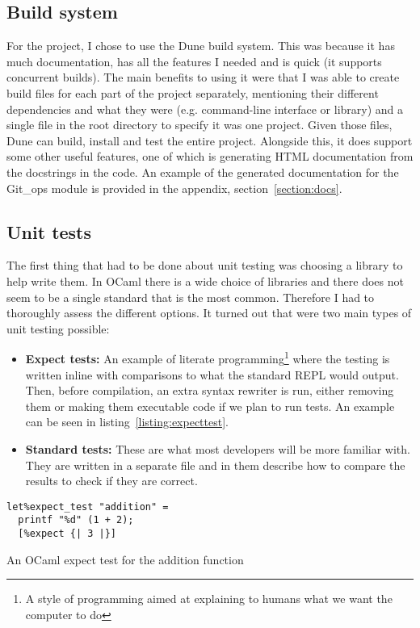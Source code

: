 \subsection{Build system}

For the project, I chose to use the Dune\cite{code_dune} build system. This was because it has much documentation, has all the features I needed and is quick (it supports concurrent builds). The main benefits to using it were that I was able to create build files for each part of the project separately, mentioning their different dependencies and what they were (e.g. command-line interface or library) and a single file in the root directory to specify it was one project. Given those files, Dune can build, install and test the entire project. Alongside this, it does support some other useful features, one of which is generating HTML documentation from the docstrings in the code. An example of the generated documentation for the Git\_ops module is provided in the appendix, section\unskip~\ref{section:docs}.

\subsection{Unit tests}

The first thing that had to be done about unit testing was choosing a library to help write them. In OCaml there is a wide choice of libraries and there does not seem to be a single standard that is the most common. Therefore I had to thoroughly assess the different options. It turned out that were two main types of unit testing possible:
\begin{itemize}
  \item \textbf{Expect tests:} An example of literate programming\footnote{A style of programming aimed at explaining to humans what we want the computer to do\cite{Knuth1984}} where the testing is written inline with comparisons to what the standard REPL would output. Then, before compilation, an extra syntax rewriter is run, either removing them or making them executable code if we plan to run tests. An example can be seen in listing\unskip~\ref{listing:expecttest}.
  \item \textbf{Standard tests:} These are what most developers will be more familiar with. They are written in a separate file and in them describe how to compare the results to check if they are correct.
\end{itemize}

\begin{listing}[h]
\begin{verbatim}
let%expect_test "addition" =
  printf "%d" (1 + 2);
  [%expect {| 3 |}]
\end{verbatim}
\caption{An OCaml expect test for the addition function}
\label{listing:expecttest}
\end{listing}

